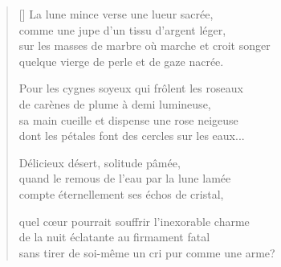{\itshape
\begin{verse}[\versewidth]
  La lune mince verse une lueur sacrée, \\
  comme une jupe d'un tissu d'argent léger, \\
  sur les masses de marbre où marche et croit songer \\
  quelque vierge de perle et de gaze nacrée.

  Pour les cygnes soyeux qui frôlent les roseaux \\
  de carènes de plume à demi lumineuse, \\
  sa main cueille et dispense une rose neigeuse \\
  dont les pétales font des cercles sur les eaux...

  Délicieux désert, solitude pâmée, \\
  quand le remous de l'eau par la lune lamée \\
  compte éternellement ses échos de cristal,

  quel cœur pourrait souffrir l'inexorable charme \\
  de la nuit éclatante au firmament fatal \\
  sans tirer de soi-même un cri pur comme une arme?
\end{verse}
}
